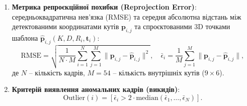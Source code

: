 \documentclass[14pt, a4paper]{extarticle}
\begin{document}
\begin{enumerate}
    \item \textbf{Метрика репроєкційної похибки (Reprojection Error)}: середньоквадратична нев'язка (RMSE) та середня абсолютна відстань між детектованими координатами кутів $\mathbf{p}_{i,j}$ та спроєктованими 3D точками шаблона $\hat{\mathbf{p}}_{i,j}(K, D, R_i, \mathbf{t}_i)$:
    \begin{equation}
        \text{RMSE} = \sqrt{\frac{1}{N \cdot M} \sum_{i=1}^N \sum_{j=1}^M \| \mathbf{p}_{i,j} - \hat{\mathbf{p}}_{i,j} \|^2},
        \quad
        \bar{\epsilon}_i = \frac{1}{M} \sum_{j=1}^M \| \mathbf{p}_{i,j} - \hat{\mathbf{p}}_{i,j} \|,
    \end{equation}
    де $N$ -- кількість кадрів, $M = 54$ -- кількість внутрішніх кутів ($9 \times 6$).

    \item \textbf{Критерій виявлення аномальних кадрів (викидів)}:
    \begin{equation}
        \text{Outlier}(i) = \left[ \bar{\epsilon}_i > 2 \cdot \text{median}(\bar{\epsilon}_1, \dots, \bar{\epsilon}_N) \right].
    \end{equation}
\end{enumerate}
\end{document}
